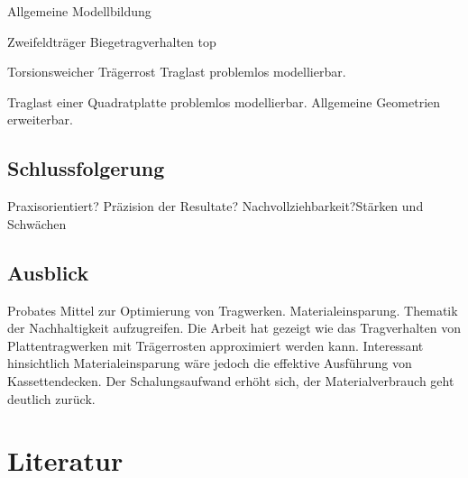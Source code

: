 \documentclass[
  11pt,
  letterpaper,
]{scrreprt}
\begin{document}
Allgemeine Modellbildung

Zweifeldträger Biegetragverhalten top

Torsionsweicher Trägerrost Traglast problemlos modellierbar.

Traglast einer Quadratplatte problemlos modellierbar. Allgemeine
Geometrien erweiterbar.

\section{Schlussfolgerung}\label{schlussfolgerung}

Praxisorientiert? Präzision der Resultate? Nachvollziehbarkeit?Stärken
und Schwächen

\section{Ausblick}\label{ausblick}

Probates Mittel zur Optimierung von Tragwerken. Materialeinsparung.
Thematik der Nachhaltigkeit aufzugreifen. Die Arbeit hat gezeigt wie das
Tragverhalten von Plattentragwerken mit Trägerrosten approximiert werden
kann. Interessant hinsichtlich Materialeinsparung wäre jedoch die
effektive Ausführung von Kassettendecken. Der Schalungsaufwand erhöht
sich, der Materialverbrauch geht deutlich zurück.


\chapter*{Literatur}\label{literatur}

\end{document}
